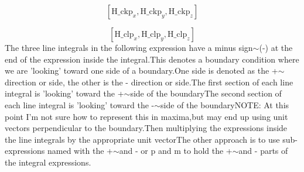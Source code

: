 \documentclass[fleqn]{article}
\begin{document}
\[\tag{\% o335} 
\left[ {{\ensuremath{\mathrm{H\_ ckp}}}_x}\operatorname{,}{{\ensuremath{\mathrm{H\_ ckp}}}_y}\operatorname{,}{{\ensuremath{\mathrm{H\_ ckp}}}_z}\right] \mbox{}\]

\[\tag{\% o336} 
\left[ {{\ensuremath{\mathrm{H\_ clp}}}_x}\operatorname{,}{{\ensuremath{\mathrm{H\_ clp}}}_y}\operatorname{,}{{\ensuremath{\mathrm{H\_ clp}}}_z}\right] \mbox{}
\]
The three line integrals in the following expression have a minus sign\ensuremath{\sim }(-) at the end of the expression inside the integral.This denotes a boundary condition where we are 'looking' toward one side of a boundary.One side is denoted as the +\ensuremath{\sim }direction or side, the other is the - direction or side.The first section of each line integral is 'looking' toward the +\ensuremath{\sim }side of the boundaryThe second section of each line integral is 'looking' toward the -\ensuremath{\sim }side of the boundaryNOTE: At this point I'm not sure how to represent this in maxima,but may end up using unit vectors perpendicular to the boundary.Then multiplying the expressions inside the line integrals by the appropriate unit vectorThe other approach is to use sub-expressions named with the +\ensuremath{\sim }and - or p and m to hold the +\ensuremath{\sim }and - parts of the integral expressions.
\end{document}
